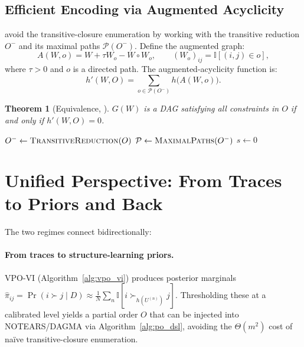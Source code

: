 \documentclass{article}
\newtheorem{theorem}{Theorem}
\theoremstyle{definition}
\theoremstyle{remark}
\newcommand{\indic}{\mathbb{I}}
\begin{document}
\subsection{Efficient Encoding via Augmented Acyclicity}
\citet{ban2024differentiable} avoid the transitive-closure enumeration
by working with the transitive reduction $O^-$ and its maximal paths
$\mathcal{P}(O^-)$.
Define the augmented graph:
\begin{equation}
A(W,o) = W + \tau W_o - W\circ W_o,
\qquad
(W_o)_{ij} = \indic[(i,j)\in o],
\label{eq:augment}
\end{equation}
where $\tau>0$ and $o$ is a directed path.
The augmented-acyclicity function is:
\begin{equation}
h'(W,O) = \sum_{o\in\mathcal{P}(O^-)} h\bigl(A(W,o)\bigr).
\label{eq:h_prime}
\end{equation}

\begin{theorem}[Equivalence, {\citet[Theorem~1]{ban2024differentiable}}]
\label{thm:equiv}
$G(W)$ is a DAG satisfying all constraints in $O$ if and only if
$h'(W,O)=0$.
\end{theorem}

\begin{algorithm}[t]
\caption{PO-DSL: Augmented acyclicity for partial-order
priors~\citep{ban2024differentiable}}
\label{alg:po_dsl}
$O^-\leftarrow\textsc{TransitiveReduction}(O)$\;
$\mathcal{P}\leftarrow\textsc{MaximalPaths}(O^-)$\;
$s\leftarrow 0$\;
\end{algorithm}

\section{Unified Perspective: From Traces to Priors and Back}
\label{sec:unified}

The two regimes connect bidirectionally:

\paragraph{From traces to structure-learning priors.}
VPO-VI (Algorithm~\ref{alg:vpo_vi}) produces posterior marginals
$\hat\pi_{ij}=\Pr(i\succ j\mid D)\approx
\frac{1}{N}\sum_n\indic[i\succ_{h(U^{(n)})}j]$.
Thresholding these at a calibrated level yields a partial order $O$ that
can be injected into NOTEARS/DAGMA via Algorithm~\ref{alg:po_dsl},
avoiding the $\Theta(m^2)$ cost of na\"ive transitive-closure enumeration.
\end{document}
